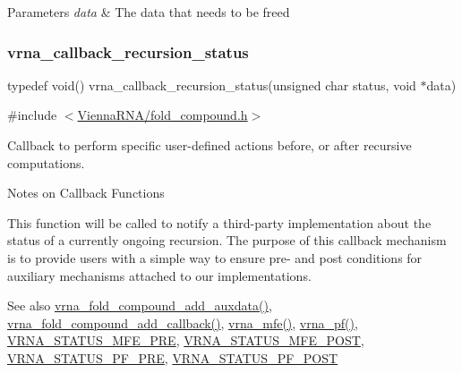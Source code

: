 \begin{DoxyParams}{Parameters}
{\em data} & The data that needs to be free\textquotesingle{}d \\
\hline
\end{DoxyParams}
\mbox{\label{group__fold__compound_gac86036fa8cad1108832335063243cdc8}} 
\subsubsection{\texorpdfstring{vrna\+\_\+callback\+\_\+recursion\+\_\+status}{vrna\_callback\_recursion\_status}}
{\footnotesize\ttfamily typedef void() vrna\+\_\+callback\+\_\+recursion\+\_\+status(unsigned char status, void $\ast$data)}



{\ttfamily \#include $<$\hyperlink{fold__compound_8h}{Vienna\+R\+N\+A/fold\+\_\+compound.\+h}$>$}



Callback to perform specific user-\/defined actions before, or after recursive computations. 

\begin{DoxyRefDesc}{Notes on Callback Functions}
\item[\hyperlink{callbacks__callbacks000002}{Notes on Callback Functions}]This function will be called to notify a third-\/party implementation about the status of a currently ongoing recursion. The purpose of this callback mechanism is to provide users with a simple way to ensure pre-\/ and post conditions for auxiliary mechanisms attached to our implementations. \end{DoxyRefDesc}


\begin{DoxySeeAlso}{See also}
\hyperlink{group__fold__compound_gafc44c76a1aacf61bfccb8cd698772b98}{vrna\+\_\+fold\+\_\+compound\+\_\+add\+\_\+auxdata()}, \hyperlink{group__fold__compound_ga680ddfe1e67d1459689b1e92c80b9c4c}{vrna\+\_\+fold\+\_\+compound\+\_\+add\+\_\+callback()}, \hyperlink{group__mfe__global_gabd3b147371ccf25c577f88bbbaf159fd}{vrna\+\_\+mfe()}, \hyperlink{group__part__func__global_ga29e256d688ad221b78d37f427e0e99bc}{vrna\+\_\+pf()}, \hyperlink{group__fold__compound_ga1a5053dc8acbb0111e852988726f07d6}{V\+R\+N\+A\+\_\+\+S\+T\+A\+T\+U\+S\+\_\+\+M\+F\+E\+\_\+\+P\+RE}, \hyperlink{group__fold__compound_ga47c900ca76e56e59e2e83a06e0bde641}{V\+R\+N\+A\+\_\+\+S\+T\+A\+T\+U\+S\+\_\+\+M\+F\+E\+\_\+\+P\+O\+ST}, \hyperlink{group__fold__compound_ga91795d35ebdb6f32be50459f24b3d114}{V\+R\+N\+A\+\_\+\+S\+T\+A\+T\+U\+S\+\_\+\+P\+F\+\_\+\+P\+RE}, \hyperlink{group__fold__compound_ga1c6fa243533fd026e50f7d595eaaa565}{V\+R\+N\+A\+\_\+\+S\+T\+A\+T\+U\+S\+\_\+\+P\+F\+\_\+\+P\+O\+ST}
\end{DoxySeeAlso}

